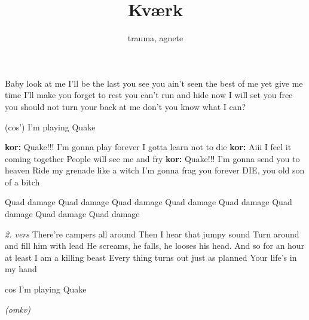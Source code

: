 \documentclass[danish]{article}
\title{Kværk}
\author{trauma, agnete}
\begin{document}
\maketitle
\begin{song}


Baby look at me
I'll be the last you see
you ain't seen the best of me yet
give me time 
I'll make you forget to rest
you can't run and hide
now I will set you free
you should not turn your back at me
don't you know what I can?

(cos') I'm playing Quake

\textbf{kor:} Quake!!!
I'm gonna play forever
I gotta learn not to die
\textbf{kor:} Aiii
I feel it coming together
People will see me and fry
\textbf{kor:} Quake!!!
I'm gonna send you to heaven
Ride my grenade like a witch
I'm gonna frag you forever
DIE, you old son of a bitch

Quad damage Quad damage
Quad damage Quad damage
Quad damage Quad damage
Quad damage Quad damage

\emph{2.  vers}
There're campers all around
Then I hear that jumpy sound
Turn around and fill him with lead
He screams, he falls, he looses his head.
And so for an hour at least
I am a killing beast
Every thing turns out just as planned
Your life's in my hand

cos I'm playing Quake

\emph{(omkv)}

\end{song}
\end{document}
